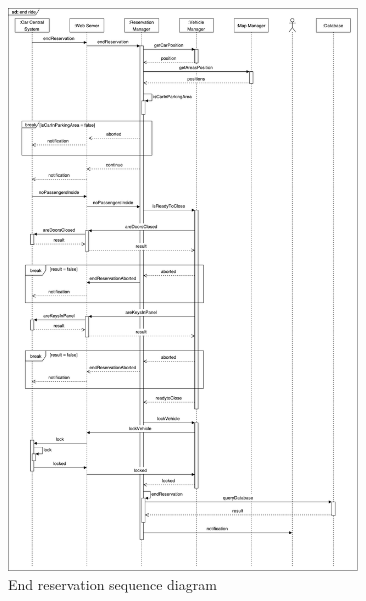 \begin{figure}[H]
        \includegraphics[width=350px]{../Datas/diagrams/endRide.pdf}
        \caption{End reservation sequence diagram}
        \label{fig:end-reserv-seq-dig}
\end{figure}
